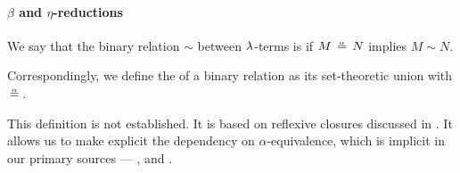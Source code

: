 \paragraph{\( \beta \) and \( \eta \)-reductions}

\begin{definition}\label{def:alpha_reflexive}\mimprovised
  We say that the binary relation \( {\sim} \) between \( \mathrm{\lambda} \)-terms is  if \( M \aequiv N \) implies \( M \sim N \).

  Correspondingly, we define the  of a binary relation as its set-theoretic union with \( {\aequiv} \).
\end{definition}
\begin{comments}
  \item This definition is not established. It is based on reflexive closures discussed in . It allows us to make explicit the dependency on \( \alpha \)-equivalence, which is implicit in our primary sources --- \cite[ch. 3]{Barendregt1984LambdaCalculus}, \cite[def. 1B2]{Hindley1997BasicSTT} and \cite[191]{Герасимов2011Вычислимость}.
\end{comments}

